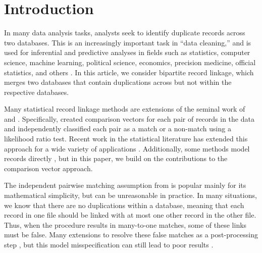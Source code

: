\documentclass[ba]{imsart}
\begin{document}


\section{Introduction}
\label{sec:introduction}

In many data analysis tasks, analysts seek to identify duplicate records across two databases. This is an increasingly important task in ``data cleaning,'' and is used for inferential and predictive analyses in fields such as statistics, computer science, machine learning, political science, economics, precision medicine, official statistics, and others \citep{christen_2012, gutman2013bayesian, DalzellReiter18, tang2020}. In this article, we consider bipartite record linkage, which merges two databases that contain duplications across but not within the respective databases. 

Many statistical record linkage methods are extensions of the seminal work of \cite{fellegi_theory_1969} and \cite{newcombe_automatic_1959}. Specifically, \cite{fellegi_theory_1969} created comparison vectors for each pair of records in the data and independently classified each pair as a match or a non-match using a likelihood ratio test. Recent work in the statistical literature has extended this approach for a wide variety of applications \citep{Winkler1990, fair2004generalized, wagner2014person, gill2003english, enamorado2019using, aleshinguendel2021multifile}. Additionally, some methods model records directly \citep{steorts_bayesian_2016, marchant_distributed_2019, betancourt2021prior}, but in this paper, we build on the contributions to the comparison vector approach. 


The independent pairwise matching assumption from \cite{fellegi_theory_1969} is popular mainly for its mathematical simplicity, but can be unreasonable in practice. In many situations, we know that there are no duplications within a database, meaning that each record in one file should be linked with at most one other record in the other file. Thus, when the procedure results in many-to-one matches, some of these links must be false. Many extensions to \cite{fellegi_theory_1969} resolve these false matches as a post-processing step \citep{jaro1989}, but this model misspecification can still lead to poor results \citep{sadinle_bayesian_2017}.
\end{document}
